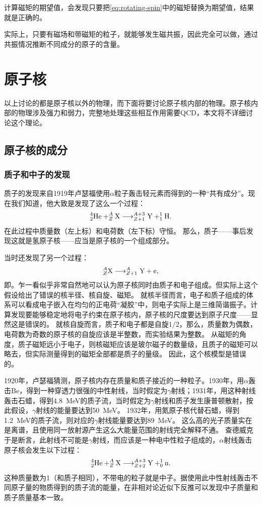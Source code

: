 计算磁矩的期望值，会发现只要把\eqref{eq:rotating-spin}中的磁矩替换为期望值，结果就是正确的。

实际上，只要有磁场和带磁矩的粒子，就能够发生磁共振，因此完全可以做，通过共振情况推断不同成分的原子的含量。

\chapter{原子核}

以上讨论的都是原子核以外的物理，而下面将要讨论原子核内部的物理。原子核内部的物理涉及强力和弱力，完整地处理这些相互作用需要QCD，本文将不详细讨论这个理论。

\section{原子核的成分}

\subsection{质子和中子的发现}

质子的发现来自1919年卢瑟福使用$\alpha$粒子轰击轻元素而得到的一种“共有成分”。现在我们知道，他大致是发现了这么一个过程：
\[
    \nuclear{He}{4}{2} + \nuclear{X}{A}{Z} \longrightarrow \nuclear{Y}{A+3}{Z+1} + \nuclear{H}{1}{1}.
\]
在此过程中质量数（左上标）和电荷数（左下标）守恒。
那么，质子——事后发现这就是氢原子核——应当是原子核的一个组成部分。

当时还发现了另一个过程：
\[
    \nuclear{X}{A}{Z} \longrightarrow \nuclear{Y}{A}{Z+1} + \text{e},
\]
即。乍一看似乎非常自然地可以认为原子核同时由质子和电子组成。但实际上这个假设给出了错误的核半径、核自旋、磁矩。
就核半径而言，电子和质子组成的体系可以看成电子嵌入在均匀的正电荷“凝胶”中，则电子实际上是三维简谐振子。计算发现要能够稳定地将电子约束在原子核内，原子核的尺度要达到原子尺度——显然这是错误的。
就核自旋而言，质子和电子都是自旋$1/2$，那么，质量数为偶数，电荷数为奇数的原子核的自旋应该是半整数，而实验结果为整数。
从磁矩的角度，质子磁矩远小于电子，则核磁矩应该是玻尔磁子的数量级，且质子的磁矩可以略去，但实际测量得到的磁矩全部都是质子的量级。
因此，这个核模型是错误的。

1920年，卢瑟福猜测，原子核内存在质量和质子接近的一种粒子。1930年，用$\alpha$轰击Be，得到一种穿透力很强的中性射线，当时假定为$\gamma$射线；1931年，用这种射线轰击石蜡，得到\SI{4.8}{MeV}的质子流，当时假定为$\gamma$射线和质子发生康普顿散射，按此假设，$\gamma$射线的能量要达到\SI{50}{MeV}。
1932年，用氮原子核代替石蜡，得到\SI{1.2}{MeV}的质子流，则对应的$\gamma$射线能量要达到\SI{89}{MeV}。
这么高的光子质量实在是离谱，且使用同一放射源产生这么大能量范围的射线完全解释不通。
查德威克于是断言，此射线不可能是$\gamma$射线，而应该是一种电中性粒子组成的，$\alpha$射线轰击原子核会发生以下过程：
\[
    \nuclear{He}{4}{2} + \nuclear{X}{A}{Z} \longrightarrow \nuclear{Y}{A+3}{Z+2} + \nuclear{n}{1}{0}.
\]
这种质量数为1（和质子相同），不带电的粒子就是中子。据使用此中性射线轰击不同原子量的物质得到的质子流的能量，在非相对论近似下反推可以发现中子质量和质子质量基本一致。

